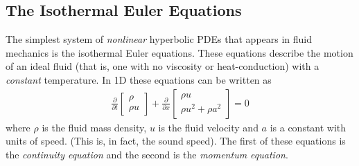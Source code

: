 \documentclass[12pt]{article}
\theoremstyle{definition}
\theoremstyle{definition}
\theoremstyle{definition}
\begin{document}
\subsection{The Isothermal Euler Equations}

The simplest system of \emph{nonlinear} hyperbolic PDEs that appears
in fluid mechanics is the isothermal Euler equations. These equations
describe the motion of an ideal fluid (that is, one with no viscosity
or heat-conduction) with a \emph{constant} temperature. In 1D these
equations can be written as
\begin{align}
  \frac{\partial}{\partial{t}}
  \left[
    \begin{matrix}
      \rho \\
      \rho u
    \end{matrix}
  \right]
  +
  \frac{\partial}{\partial{x}}
  \left[
    \begin{matrix}
      \rho u \\
      \rho u^2 + \rho a^2
    \end{matrix}
  \right]
  =
  0  
\end{align}
where $\rho$ is the fluid mass density, $u$ is the fluid velocity and
$a$ is a constant with units of speed. (This is, in fact, the sound
speed). The first of these equations is the \emph{continuity equation}
and the second is the \emph{momentum equation}.
\end{document}
